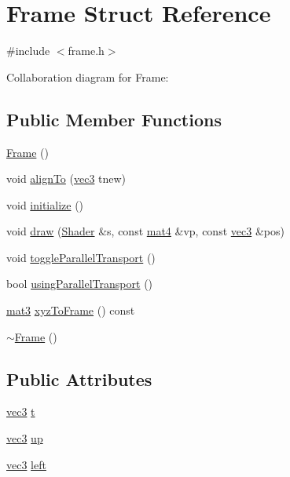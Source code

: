 \hypertarget{structFrame}{}\section{Frame Struct Reference}
\label{structFrame}


{\ttfamily \#include $<$frame.\+h$>$}



Collaboration diagram for Frame\+:
\subsection*{Public Member Functions}
\begin{DoxyCompactItemize}
\item 
\hyperlink{structFrame_ad2e5946cf41d4817e750500acf05d02b}{Frame} ()
\item 
void \hyperlink{structFrame_a864ae4085d4ddd24f54cecb185eb74d1}{align\+To} (\hyperlink{classvec3}{vec3} tnew)
\item 
void \hyperlink{structFrame_af05752a6a14d36a05c3b764e7cdcff74}{initialize} ()
\item 
void \hyperlink{structFrame_ab7273177761d19c6a23c5317ae00e1b5}{draw} (\hyperlink{classShader}{Shader} \&s, const \hyperlink{classmat4}{mat4} \&vp, const \hyperlink{classvec3}{vec3} \&pos)
\item 
void \hyperlink{structFrame_adb8f667153eeb3dbc7cdfe9065bcf36c}{toggle\+Parallel\+Transport} ()
\item 
bool \hyperlink{structFrame_a35f4f6c081a69a181a2cd25f5114e77a}{using\+Parallel\+Transport} ()
\item 
\hyperlink{classmat3}{mat3} \hyperlink{structFrame_a97222e5804e4517f041badba6d68f96c}{xyz\+To\+Frame} () const 
\item 
\hyperlink{structFrame_abec8c7bccdfc88cb4da137caae9f73d6}{$\sim$\+Frame} ()
\end{DoxyCompactItemize}
\subsection*{Public Attributes}
\begin{DoxyCompactItemize}
\item 
\hyperlink{classvec3}{vec3} \hyperlink{structFrame_a9525a4f9bd5830f785dc9479f961a751}{t}
\item 
\hyperlink{classvec3}{vec3} \hyperlink{structFrame_ad9275ea49c9bc78e7631f3275cbfada2}{up}
\item 
\hyperlink{classvec3}{vec3} \hyperlink{structFrame_aca6b9cb1c84d3072c2ba3e761d196b9b}{left}
\end{DoxyCompactItemize}
